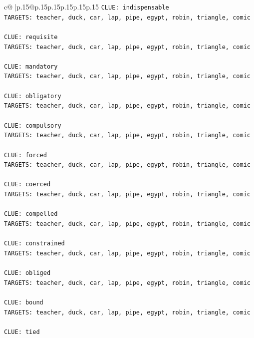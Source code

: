 \documentclass{article}
\begin{document}
{\begin{supertabular}{c@{$\;$}|p{.15\linewidth}@{}p{.15\linewidth}p{.15\linewidth}p{.15\linewidth}p{.15\linewidth}p{.15\linewidth}}
{{{\texttt{CLUE: indispensable} \\
\texttt{TARGETS: teacher, duck, car, lap, pipe, egypt, robin, triangle, comic} \\
\\ 
\texttt{CLUE: requisite} \\
\texttt{TARGETS: teacher, duck, car, lap, pipe, egypt, robin, triangle, comic} \\
\\ 
\texttt{CLUE: mandatory} \\
\texttt{TARGETS: teacher, duck, car, lap, pipe, egypt, robin, triangle, comic} \\
\\ 
\texttt{CLUE: obligatory} \\
\texttt{TARGETS: teacher, duck, car, lap, pipe, egypt, robin, triangle, comic} \\
\\ 
\texttt{CLUE: compulsory} \\
\texttt{TARGETS: teacher, duck, car, lap, pipe, egypt, robin, triangle, comic} \\
\\ 
\texttt{CLUE: forced} \\
\texttt{TARGETS: teacher, duck, car, lap, pipe, egypt, robin, triangle, comic} \\
\\ 
\texttt{CLUE: coerced} \\
\texttt{TARGETS: teacher, duck, car, lap, pipe, egypt, robin, triangle, comic} \\
\\ 
\texttt{CLUE: compelled} \\
\texttt{TARGETS: teacher, duck, car, lap, pipe, egypt, robin, triangle, comic} \\
\\ 
\texttt{CLUE: constrained} \\
\texttt{TARGETS: teacher, duck, car, lap, pipe, egypt, robin, triangle, comic} \\
\\ 
\texttt{CLUE: obliged} \\
\texttt{TARGETS: teacher, duck, car, lap, pipe, egypt, robin, triangle, comic} \\
\\ 
\texttt{CLUE: bound} \\
\texttt{TARGETS: teacher, duck, car, lap, pipe, egypt, robin, triangle, comic} \\
\\ 
\texttt{CLUE: tied} \\
}}}
\end{supertabular}}
\end{document}
